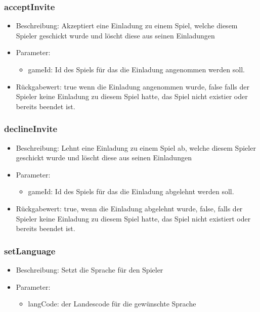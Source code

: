 \documentclass[a4paper]{scrreprt}
\begin{document}
	\subsubsection{acceptInvite}
	\begin{itemize}
		\item Beschreibung: Akzeptiert eine Einladung zu einem Spiel, welche diesem Spieler geschickt wurde und löscht diese aus seinen Einladungen
		\item Parameter:
		\begin{itemize}
			\item gameId: Id des Spiels für das die Einladung angenommen werden soll.
		\end{itemize}
		\item Rückgabewert: true wenn die Einladung angenommen wurde, false falls der Spieler keine Einladung zu diesem Spiel hatte, das Spiel nicht existier oder bereits beendet ist.
	\end{itemize}
	\subsubsection{declineInvite}
	\begin{itemize}
		\item Beschreibung: Lehnt eine Einladung zu einem Spiel ab, welche diesem Spieler geschickt wurde und löscht diese aus seinen Einladungen
		\item Parameter:
		\begin{itemize}
			\item gameId: Id des Spiels für das die Einladung abgelehnt werden soll.
		\end{itemize}
		\item Rückgabewert: true, wenn die Einladung abgelehnt wurde, false, falls der Spieler keine Einladung zu diesem Spiel hatte, das Spiel nicht existiert oder bereits beendet ist.
	\end{itemize}
	\subsubsection{setLanguage}
	\begin{itemize}
		\item Beschreibung: Setzt die Sprache für den Spieler
		\item Parameter:
		\begin{itemize}
			\item langCode: der Landescode für die gewünschte Sprache
		\end{itemize}
	\end{itemize}
\end{document}

